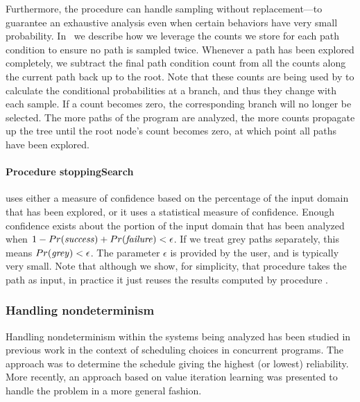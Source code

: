 Furthermore, the procedure can handle sampling without replacement---to guarantee an exhaustive analysis even when certain behaviors have very small probability. 
In~\cite{filieri2014statistical} we describe how we leverage the counts we store for each path condition to ensure no path is sampled twice. Whenever a path has been explored completely, 
we subtract the final path condition count from all the counts along the current path back up to the root. Note that these counts are being used by  to calculate the conditional probabilities at a branch, and thus they change with each sample. If a count becomes zero, the corresponding branch will no longer be selected. The more paths of the program are analyzed, 
the more counts propagate up the tree until the root node's count becomes zero, at which point all paths have been explored. 

\paragraph{Procedure stoppingSearch} uses either a measure of confidence based on the percentage of the input domain that has been explored, or it uses a statistical measure of confidence. 
Enough confidence exists about the portion of the input domain that has been analyzed when  $1 - Pr(\mathit{success}) + Pr(\mathit{failure}) < \epsilon$.  If we treat grey paths separately, this means $Pr(\mathit{grey}) < \epsilon$. The parameter $\epsilon$ is provided by the user, and is typically very small. Note that although we show, for simplicity, that procedure  
takes the path as input, in practice it just reuses the results computed by procedure . 


\subsubsection{Handling nondeterminism}

Handling nondeterminism within the systems being analyzed has been studied in previous work \cite{Filieri2013} in the context of scheduling choices in concurrent programs. The approach was to determine the schedule giving the highest (or lowest) reliability. More recently, an approach based on value iteration learning was presented \cite{luckow2014exact} to handle the problem in a more general fashion.

